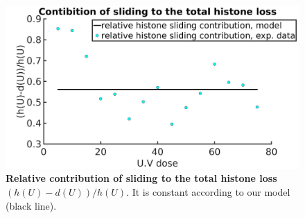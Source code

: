 \documentclass[12pt]{article}
\begin{document}
\begin{figure}[H]
\centering
\includegraphics[width=0.5\linewidth, height=0.3\textheight]{relativeSlidingContribution}
\caption{\textbf{Relative contribution of sliding to the total histone loss $(h(U)-d(U))/h(U)$}. It is constant according to our model (black line).}
\label{fig:relativeSlidingContribution}
\end{figure}

\end{document}
